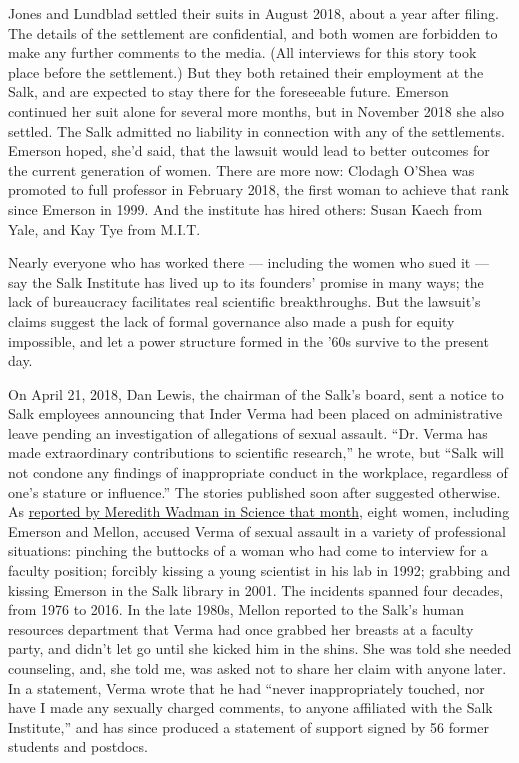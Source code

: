 Jones and Lundblad settled their suits in August 2018, about a year
after filing. The details of the settlement are confidential, and both
women are forbidden to make any further comments to the media. (All
interviews for this story took place before the settlement.) But they
both retained their employment at the Salk, and are expected to stay
there for the foreseeable future. Emerson continued her suit alone for
several more months, but in November 2018 she also settled. The Salk
admitted no liability in connection with any of the settlements. Emerson
hoped, she'd said, that the lawsuit would lead to better outcomes for
the current generation of women. There are more now: Clodagh O'Shea was
promoted to full professor in February 2018, the first woman to achieve
that rank since Emerson in 1999. And the institute has hired others:
Susan Kaech from Yale, and Kay Tye from M.I.T.

Nearly everyone who has worked there --- including the women who sued it
--- say the Salk Institute has lived up to its founders' promise in many
ways; the lack of bureaucracy facilitates real scientific breakthroughs.
But the lawsuit's claims suggest the lack of formal governance also made
a push for equity impossible, and let a power structure formed in the
'60s survive to the present day.

On April 21, 2018, Dan Lewis, the chairman of the Salk's board, sent a
notice to Salk employees announcing that Inder Verma had been placed on
administrative leave pending an investigation of allegations of sexual
assault. ``Dr. Verma has made extraordinary contributions to scientific
research,'' he wrote, but ``Salk will not condone any findings of
inappropriate conduct in the workplace, regardless of one's stature or
influence.'' The stories published soon after suggested otherwise. As
\href{https://www.sciencemag.org/news/2018/04/famed-cancer-biologist-allegedly-sexually-harassed-women-decades}{reported
by Meredith Wadman in Science that month}, eight women, including
Emerson and Mellon, accused Verma of sexual assault in a variety of
professional situations: pinching the buttocks of a woman who had come
to interview for a faculty position; forcibly kissing a young scientist
in his lab in 1992; grabbing and kissing Emerson in the Salk library in
2001. The incidents spanned four decades, from 1976 to 2016. In the late
1980s, Mellon reported to the Salk's human resources department that
Verma had once grabbed her breasts at a faculty party, and didn't let go
until she kicked him in the shins. She was told she needed counseling,
and, she told me, was asked not to share her claim with anyone later. In
a statement, Verma wrote that he had ``never inappropriately touched,
nor have I made any sexually charged comments, to anyone affiliated with
the Salk Institute,'' and has since produced a statement of support
signed by 56 former students and postdocs.

